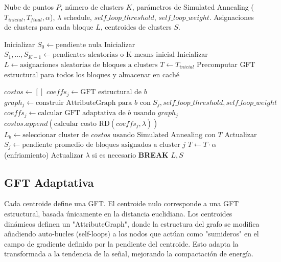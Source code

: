 \begin{algorithm}[H]
\caption{Algoritmo de Agrupamiento Tasa-Distorsión (RD Clustering)}
\begin{algorithmic}[1]
\REQUIRE Nube de puntos $P$, número de clusters $K$, parámetros de Simulated Annealing ($T_{inicial}, T_{final}, \alpha$), $\lambda$ schedule, $self\_loop\_threshold$, $self\_loop\_weight$.
\ENSURE Asignaciones de clusters para cada bloque $L$, centroides de clusters $S$.

\STATE Inicializar $S_0 \leftarrow \text{pendiente nula}$
\STATE Inicializar $S_1, \dots, S_{K-1} \leftarrow \text{pendientes aleatorias o K-means inicial}$
\STATE Inicializar $L \leftarrow \text{asignaciones aleatorias de bloques a clusters}$
\STATE $T \leftarrow T_{inicial}$
\STATE Precomputar GFT estructural para todos los bloques y almacenar en caché

        \STATE $costos \leftarrow []$
                \STATE $coeffs_j \leftarrow \text{GFT estructural de } b$
            \ELSE
                \STATE $graph_j \leftarrow \text{construir AttributeGraph para } b \text{ con } S_j, self\_loop\_threshold, self\_loop\_weight$
                \STATE $coeffs_j \leftarrow \text{calcular GFT adaptativa de } b \text{ usando } graph_j$
            \ENDIF
            \STATE $costos.append(\text{calcular costo RD}(coeffs_j, \lambda))$
        \ENDFOR
        \STATE $L_b \leftarrow \text{seleccionar cluster de } costos \text{ usando Simulated Annealing con } T$
    \ENDFOR
    \STATE Actualizar $S_j \leftarrow \text{pendiente promedio de bloques asignados a cluster } j$
    \STATE $T \leftarrow T \cdot \alpha$ (enfriamiento)
    \STATE Actualizar $\lambda$ si es necesario
        \STATE \textbf{BREAK}
    \ENDIF
\ENFOR
\RETURN $L, S$
\end{algorithmic}
\end{algorithm}

\subsection{GFT Adaptativa}
Cada centroide define una GFT. El centroide nulo corresponde a una GFT estructural, basada únicamente en la distancia
euclidiana. Los centroides dinámicos definen un "AttributeGraph", donde la estructura del grafo se modifica añadiendo
auto-bucles (self-loops) a los nodos que actúan como "sumideros" en el campo de gradiente definido por la pendiente
del centroide. Esto adapta la transformada a la tendencia de la señal, mejorando la compactación de energía.


